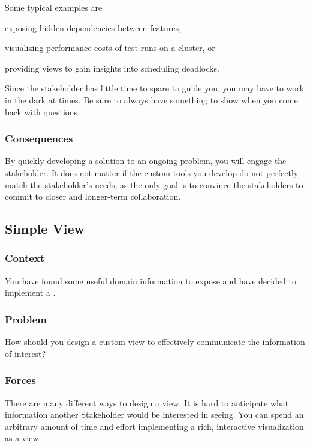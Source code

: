 \documentclass[sigconf]{acmart}
\renewcommand{\nbc}[3]{} %
\newcommand\on[1]{\nbc{ON}{#1}{olive}} %
\newcommand{\pattern}[1]{\emph{\nameref{pat:#1}}\xspace}
\begin{document}
Some typical examples are 
\begin{inparaenum}[(i)]
\item exposing hidden dependencies between features, 
\item visualizing performance costs of test runs on a cluster, or
\item providing views to gain insights into scheduling deadlocks.
\end{inparaenum}

Since the stakeholder has little time to spare to guide you, you may have to work in the dark at times.
Be sure to always have something to show when you come back with questions.

\subsubsection*{Consequences}
By quickly developing a solution to an ongoing problem, you will engage the stakeholder.
It does not matter if the custom tools you develop do not perfectly match the stakeholder's needs, as the only goal is to convince the stakeholders to commit to closer and longer-term collaboration.

\subsection*{Simple View}\label{pat:simpleView}
\subsubsection*{Context}
You have found some useful domain information to expose and have decided to implement a \pattern{customView}.

\subsubsection*{Problem}
How should you design a custom view to effectively communicate the information of interest?

\subsubsection*{Forces}
There are many different ways to design a view.
It is hard to anticipate what information another Stakeholder would be interested in seeing.
You can spend an arbitrary amount of time and effort implementing a rich, interactive visualization as a view.
\end{document}
